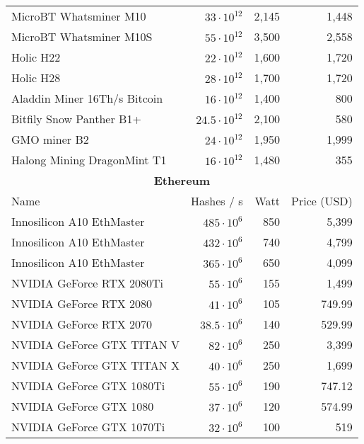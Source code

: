 \begin{longtable}{|p{}|r|r|r|}
  MicroBT Whatsminer M10 &       $33 \cdot 10^{12}$ & 2,145 & 1,448 \\
  MicroBT Whatsminer M10S &      $55 \cdot 10^{12}$ & 3,500 & 2,558 \\
  Holic H22 &                    $22 \cdot 10^{12}$ & 1,600 & 1,720 \\
  Holic H28 &                    $28 \cdot 10^{12}$ & 1,700 & 1,720 \\
  Aladdin Miner 16Th/s Bitcoin & $16 \cdot 10^{12}$ & 1,400 & 800 \\
  Bitfily Snow Panther B1+ &     $24.5 \cdot 10^{12}$ & 2,100 & 580 \\
  GMO miner B2 &                 $24 \cdot 10^{12}$ & 1,950 & 1,999 \\
  Halong Mining DragonMint T1 &  $16 \cdot 10^{12}$ & 1,480 & 355 \\
  \hline
  \multicolumn{4}{|c|}{\textbf{Ethereum}} \\
  \hline
  Name & Hashes / s & Watt & Price (USD)\\
  \hhline{|=|=|=|=|}
  Innosilicon A10 EthMaster                                           & $485 \cdot 10^6$ & 850 & 5,399 \\
  Innosilicon A10 EthMaster                                           & $432 \cdot 10^6$ & 740 & 4,799 \\
  Innosilicon A10 EthMaster                                           & $365 \cdot 10^6$ & 650 & 4,099 \\
  NVIDIA GeForce RTX 2080Ti                                           & $ 55 \cdot 10^6$ & 155 & 1,499 \\
  NVIDIA GeForce RTX 2080                                             & $ 41 \cdot 10^6$ & 105 & 749.99 \\
  NVIDIA GeForce RTX 2070                                             & $ 38.5 \cdot 10^6$ & 140 & 529.99 \\
  NVIDIA GeForce GTX TITAN V                                          & $ 82 \cdot 10^6$ & 250 & 3,399 \\
  NVIDIA GeForce GTX TITAN X                                          & $ 40 \cdot 10^6$ & 250 & 1,699 \\
  NVIDIA GeForce GTX 1080Ti                                           & $ 55 \cdot 10^6$ & 190 & 747.12 \\
  NVIDIA GeForce GTX 1080                                             & $ 37 \cdot 10^6$ & 120 & 574.99 \\
  NVIDIA GeForce GTX 1070Ti                                           & $ 32 \cdot 10^6$ & 100 & 519 \\

\end{longtable}
